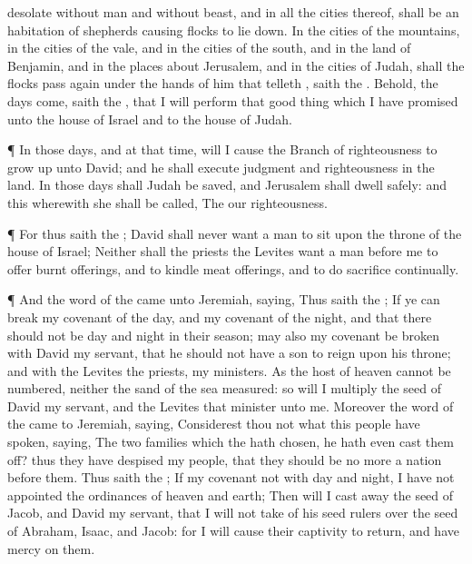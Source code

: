 {desolate without
man and without
beast, and in all the
cities thereof, shall be an
habitation of
shepherds causing
{}
flocks to lie
down.
In the
cities of the
mountains, in the
cities of the
vale, and in the
cities of the
south, and in the
land of
Benjamin, and in the places
about
Jerusalem, and in the
cities of
Judah, shall the
flocks pass
again under the
hands of him that
telleth
{},
saith the
{}.
Behold, the
days
come,
saith the
{}, that I will
perform that
good
thing which I have
promised unto the
house of
Israel and to the
house of
Judah.
\par }{\PP {}¶ In those
days, and at that
time, will I cause the
Branch of
righteousness to grow
up unto
David; and he shall
execute
judgment and
righteousness in the
land.
In those
days shall
Judah be
saved, and
Jerusalem shall
dwell
safely: and this
{} wherewith she shall be
called, The
{} our
righteousness.
\par }{\PP {}¶ For thus
saith the
{};
David shall
never
want a
man to
sit upon the
throne of the
house of
Israel;
Neither shall the
priests the
Levites
want a
man
before me to
offer burnt
offerings, and to
kindle meat
offerings, and to
do
sacrifice
continually.
\par }{\PP {}¶ And the
word of the
{} came unto
Jeremiah,
saying,
Thus
saith the
{}; If ye can
break my
covenant of the
day, and my
covenant of the
night, and that there should not be
day and
night in their
season;
 may also my
covenant be
broken with
David my
servant, that he should not have a
son to
reign upon his
throne; and with the
Levites the
priests, my
ministers.
As the
host of
heaven cannot be
numbered, neither the
sand of the
sea
measured: so will I
multiply the
seed of
David my
servant, and the
Levites that
minister unto me.
Moreover the
word of the
{} came to
Jeremiah,
saying,
Considerest thou not what this
people have
spoken,
saying, The
two
families which the
{} hath
chosen, he hath even cast them
off? thus they have
despised my
people, that they should be no more a
nation
before them.
Thus
saith the
{}; If my
covenant
{} not with
day and
night,
{} I have not
appointed the
ordinances of
heaven and
earth;
Then will I cast
away the
seed of
Jacob, and
David my
servant,
{} that I will not
take
{} of his
seed
{}
rulers over the
seed of
Abraham,
Isaac, and
Jacob: for I will cause their
captivity to
return, and have
mercy on them.

}
